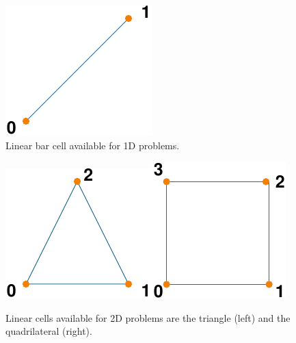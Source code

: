 \noindent \begin{center}
\begin{figure}[H]
\noindent \begin{centering}
\includegraphics{runpylith/figs/bar2} 
\par\end{centering}

\caption{Linear bar cell available for 1D problems.}


\label{fig:1D-linear-elements} 
\end{figure}

\par\end{center}

\noindent \begin{center}
\begin{figure}[H]
\noindent \begin{centering}
\includegraphics{runpylith/figs/tri3}\hspace*{0.5in}\includegraphics{runpylith/figs/quad4}
\par\end{centering}

\caption{Linear cells available for 2D problems are the triangle (left) and
the quadrilateral (right).}


\label{fig:2D-linear-elements} 
\end{figure}

\par\end{center}

